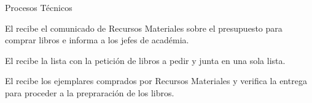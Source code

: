 \begin{PDescripcion}

  \Ppaso Procesos Técnicos
	\begin{enumerate}
		\Ppaso[\itarea]  El  recibe el comunicado de Recursos Materiales sobre el presupuesto para comprar libros e informa a los jefes de académia.
	\end{enumerate}

	\begin{enumerate}
		\Ppaso[\itarea]  El  recibe la lista con la petición de libros a pedir y junta en una sola lista.
	\end{enumerate}

	\begin{enumerate}
		\Ppaso[\itarea]  El  recibe los ejemplares comprados por Recursos Materiales y verifica la entrega para proceder a la prepraración de los libros.
	\end{enumerate}	
\end{PDescripcion}




